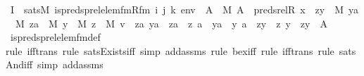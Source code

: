 \begin{isabellebody}
\ I{}\ {\isacharcolon}{\kern0pt}\ {\isachardoublequoteopen}sats{\isacharparenleft}{\kern0pt}M{\isacharcomma}{\kern0pt}\ is{\isacharunderscore}{\kern0pt}preds{\isacharunderscore}{\kern0pt}prel{\isacharunderscore}{\kern0pt}elem{\isacharunderscore}{\kern0pt}fm{\isacharparenleft}{\kern0pt}Rfm{\isacharcomma}{\kern0pt}\ i{\isacharcomma}{\kern0pt}\ j{\isacharcomma}{\kern0pt}\ k{\isacharparenright}{\kern0pt}{\isacharcomma}{\kern0pt}\ env{\isacharparenright}{\kern0pt}\ {\isasymlongleftrightarrow}\ {\isacharparenleft}{\kern0pt}{\isasymexists}A\ {\isasymin}\ M{\isachardot}{\kern0pt}\ A\ {\isacharequal}{\kern0pt}\ preds{\isacharunderscore}{\kern0pt}rel{\isacharparenleft}{\kern0pt}R{\isacharcomma}{\kern0pt}\ x{\isacharparenright}{\kern0pt}\ {\isasymand}\ {\isacharparenleft}{\kern0pt}{\isasymexists}zy\ {\isasymin}\ M{\isachardot}{\kern0pt}\ {\isasymexists}ya\ {\isasymin}\ M{\isachardot}{\kern0pt}\ {\isasymexists}za\ {\isasymin}\ M{\isachardot}{\kern0pt}\ {\isasymexists}y\ {\isasymin}\ M{\isachardot}{\kern0pt}\ {\isasymexists}z\ {\isasymin}\ M{\isachardot}{\kern0pt}\ v\ {\isacharequal}{\kern0pt}\ {\isacharless}{\kern0pt}za{\isacharcomma}{\kern0pt}\ ya{\isachargreater}{\kern0pt}\ {\isasymand}\ za\ {\isacharequal}{\kern0pt}\ {\isacharless}{\kern0pt}z{\isacharcomma}{\kern0pt}\ a{\isachargreater}{\kern0pt}\ {\isasymand}\ ya\ {\isacharequal}{\kern0pt}\ {\isacharless}{\kern0pt}y{\isacharcomma}{\kern0pt}\ a{\isachargreater}{\kern0pt}\ {\isasymand}\ zy\ {\isacharequal}{\kern0pt}\ {\isacharless}{\kern0pt}z{\isacharcomma}{\kern0pt}\ y{\isachargreater}{\kern0pt}\ {\isasymand}\ zy\ {\isasymin}\ A{\isacharparenright}{\kern0pt}{\isacharparenright}{\kern0pt}{\isachardoublequoteclose}\ \isanewline
\ \ \ \ \isamarkupfalse%
\ is{\isacharunderscore}{\kern0pt}preds{\isacharunderscore}{\kern0pt}prel{\isacharunderscore}{\kern0pt}elem{\isacharunderscore}{\kern0pt}fm{\isacharunderscore}{\kern0pt}def\isanewline
\ \ \ \ \isamarkupfalse%
{\isacharparenleft}{\kern0pt}rule\ iff{\isacharunderscore}{\kern0pt}trans{\isacharcomma}{\kern0pt}\ rule\ sats{\isacharunderscore}{\kern0pt}Exists{\isacharunderscore}{\kern0pt}iff{\isacharcomma}{\kern0pt}\ simp\ add{\isacharcolon}{\kern0pt}assms{\isacharcomma}{\kern0pt}\ rule\ bex{\isacharunderscore}{\kern0pt}iff{\isacharcomma}{\kern0pt}\ rule\ iff{\isacharunderscore}{\kern0pt}trans{\isacharcomma}{\kern0pt}\ rule\ sats{\isacharunderscore}{\kern0pt}And{\isacharunderscore}{\kern0pt}iff{\isacharcomma}{\kern0pt}\ simp\ add{\isacharcolon}{\kern0pt}assms{\isacharparenright}{\kern0pt}\isanewline
\ \ \ \ \isamarkupfalse%

\end{isabellebody}
